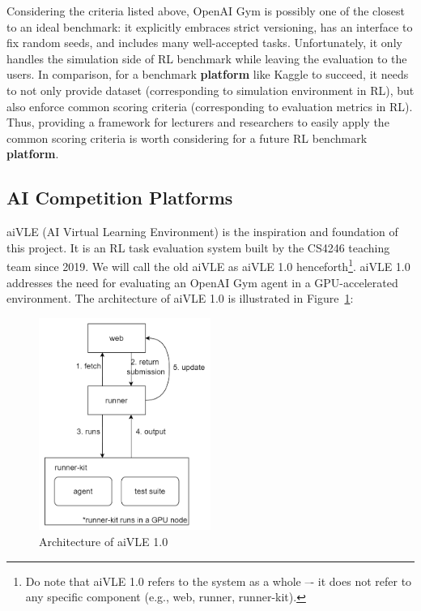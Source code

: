 Considering the criteria listed above, OpenAI Gym\parencite{openai-gym} is possibly one of the closest to an ideal benchmark: it explicitly embraces strict versioning, has an interface to fix random seeds, and includes many well-accepted tasks. Unfortunately, it only handles the simulation side of RL benchmark while leaving the evaluation to the users. In comparison, for a benchmark \textbf{platform} like Kaggle to succeed, it needs to not only provide dataset (corresponding to simulation environment in RL), but also enforce common scoring criteria (corresponding to evaluation metrics in RL). Thus, providing a framework for lecturers and researchers to easily apply the common scoring criteria is worth considering for a future RL benchmark \textbf{platform}.

\subsection{AI Competition Platforms}
\label{ch:literature-review-related-work-ai-competition-platforms}
aiVLE (AI Virtual Learning Environment) is the inspiration and foundation of this project. It is an RL task evaluation system built by the CS4246 teaching team since 2019. We will call the old aiVLE as aiVLE 1.0 henceforth\footnote{Do note that aiVLE 1.0 refers to the system as a whole –- it does not refer to any specific component (e.g., web, runner, runner-kit).}. aiVLE 1.0 addresses the need for evaluating an OpenAI Gym agent in a GPU-accelerated environment. The architecture of aiVLE 1.0 is illustrated in Figure~\ref{fig:aivle-1-arch}:

\begin{figure}[H]
    \centering
    \includegraphics[width=0.5\textwidth]{images/aivle_1_arch.png}
    \caption{Architecture of aiVLE 1.0}
    \label{fig:aivle-1-arch}
\end{figure}

